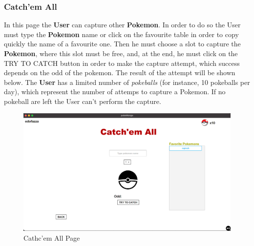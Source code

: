 \subsubsection{Catch'em All}
In this page the \textbf{User} can capture other \textbf{Pokemon}. In order to do so the User must type the \textbf{Pokemon} name or click on the favourite table in order to copy quickly the name of a favourite one. Then he must choose a slot to capture the \textbf{Pokemon}, where this slot must be free, and, at the end, he must click on the TRY TO CATCH button in order to make the capture attempt, which success depends on the odd of the pokemon. The result of the attempt will be shown below. The \textbf{User} has a limited number of \textit{pokeballs} (for instance, 10 pokeballs per day), which represent the number of attemps to capture a Pokemon. If no pokeball are left the User can't perform the capture.
\begin{figure}[H]
	\centering
	\includegraphics[width=\textwidth]{img/userManual/catch.png}
	\caption{Cathc'em All Page}
\end{figure}

